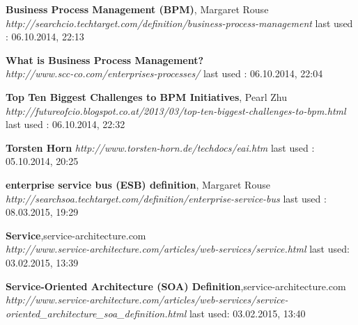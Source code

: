 \documentclass[12pt]{article}
\begin{document}
\begin{thebibliography}{56}
   \textbf{Business Process Management (BPM)}, Margaret Rouse\\
  \textit{http://searchcio.techtarget.com/definition/business-process-management}
  \newline last used : 06.10.2014, 22:13
 
 
   \textbf{What is Business Process Management? }\\
  \textit{http://www.scc-co.com/enterprises-processes/}
  \newline last used : 06.10.2014, 22:04


   \textbf{Top Ten Biggest Challenges to BPM Initiatives}, Pearl Zhu\\
  \textit{http://futureofcio.blogspot.co.at/2013/03/top-ten-biggest-challenges-to-bpm.html}
  \newline last used : 06.10.2014, 22:32
   
   
   

   \textbf{Torsten Horn}\newline
  \textit{http://www.torsten-horn.de/techdocs/eai.htm}
  \newline last used : 05.10.2014, 20:25




   	     	  
   \textbf{enterprise service bus (ESB) definition}, Margaret Rouse\\
  \textit{ http://searchsoa.techtarget.com/definition/enterprise-service-bus}
  \newline last used : 08.03.2015, 19:29 	 
   	     	     	     	  





 
   \textbf{Service},service-architecture.com \\
  \textit{http://www.service-architecture.com/articles/web-services/service.html}
  \newline last used: 03.02.2015, 13:39
     
   \textbf{Service-Oriented Architecture (SOA) Definition},service-architecture.com \\
  \textit{http://www.service-architecture.com/articles/web-services/service-oriented\_architecture\_soa\_definition.html}
  \newline last used: 03.02.2015, 13:40
     

\end{thebibliography}
\end{document}
